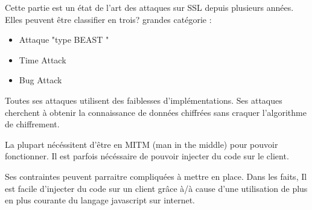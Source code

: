 Cette partie est un état de l'art des attaques sur SSL depuis plusieurs années.
Elles peuvent être classifier en trois? grandes catégorie :

\begin{itemize}
\item Attaque "type BEAST "
\item Time Attack
\item Bug Attack
\end{itemize}

Toutes ses attaques utilisent des faiblesses d'implémentations.
Ses attaques cherchent à obtenir la connaissance de données chiffrées
sans craquer l'algorithme de chiffrement. 

La plupart nécéssitent d'être en MITM (man in the middle) pour pouvoir
fonctionner. Il est parfois nécéssaire de pouvoir injecter du code 
sur le client.

Ses contraintes peuvent parraitre compliquées à mettre en place.
Dans les faits, Il est facile d'injecter du code sur un client
grâce à/à cause d'une utilisation de plus en plus courante du langage
javascript sur internet.

